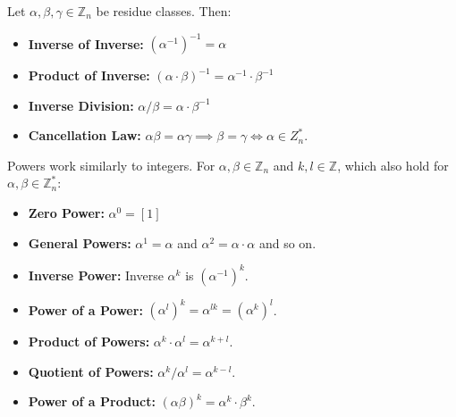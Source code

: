 \begin{theo}

    Let $\alpha,\beta,\gamma\in\mathbb{Z}_n$ be residue classes. Then: 
    \begin{itemize}
        \item \textbf{Inverse of Inverse:} $(\alpha^{-1})^{-1} = \alpha$
        \item \textbf{Product of Inverse:} $(\alpha\cdot\beta)^{-1} = \alpha^{-1}\cdot\beta^{-1}$
        \item \textbf{Inverse Division:} $\alpha/\beta = \alpha\cdot\beta^{-1}$
        \item \textbf{Cancellation Law:} $\alpha\beta = \alpha\gamma\implies\beta=\gamma\Longleftrightarrow\alpha\in Z_n^*$.
    \end{itemize}
\end{theo}
\begin{theo}
    
    Powers work similarly to integers. For $\alpha,\beta\in\mathbb{Z}_n$ and $k,l\in\mathbb{Z}$, which also hold for $\alpha,\beta\in \mathbb{Z}_n^*$:
    \begin{itemize}
        \item \textbf{Zero Power:} $\alpha^0 = [1]$
        \item \textbf{General Powers:} $\alpha^1 = \alpha$ and $\alpha^2=\alpha\cdot\alpha$ and so on.
        \item \textbf{Inverse Power:} Inverse $\alpha^k$ is $(\alpha^{-1})^k$.
        \item \textbf{Power of a Power:} $(\alpha^l)^k = \alpha^{lk}= (\alpha^k)^l$.
        \item \textbf{Product of Powers:} $\alpha^k\cdot\alpha^l = \alpha^{k+l}$.
        \item \textbf{Quotient of Powers:} $\alpha^k/\alpha^l = \alpha^{k-l}$.
        \item \textbf{Power of a Product:} $(\alpha\beta)^k = \alpha^k\cdot\beta^k$.
    \end{itemize}
\end{theo}

